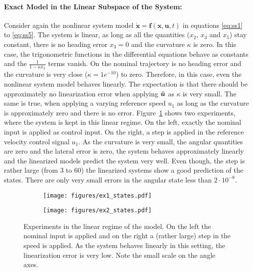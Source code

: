 \paragraph{Exact Model in the Linear Subspace of the System: }
Consider again the nonlinear system model $\mathbf{\dot{x}} = \mathbf{f}(\mathbf{x}, \mathbf{u}, t)$ in equations \eqref{eq:ss1} to \eqref{eq:ss5}.
The system is linear, as long as all the quantities ($x_2$, $x_3$ and $x_5$) stay constant, there is no heading error $x_3 = 0$ and the curvature $\kappa$ is zero.
In this case, the trigonometric functions in the differential equations behave as constants and the $\frac{1}{1- \kappa x_2}$ terms vanish.
On the nominal trajectory is no heading error and the curvature is very close ($\kappa = 1e^{-10}$) to zero.
Therefore, in this case, even the nonlinear system model behaves linearly.
The expectation is that there should be approximately no linearization error when applying $\boldsymbol{\bar{u}}$ as $\kappa$ is very small.
The same is true, when applying a varying reference speed $u_1$ as long as the curvature is approximately zero and there is no error.
Figure~\ref{fig:ex1_ex2} shows two experiments, where the system is kept in this linear regime.
On the left, exactly the nominal input is applied as control input.
On the right, a step is applied in the reference velocity control signal $u_1$.
As the curvature is very small, the angular quantities are zero and the lateral error is zero, the system behaves approximately linearly and the linearized models predict the system very well.
Even though, the step is rather large (from $3$ to $60$) the linearized systems show a good prediction of the states.
There are only very small errors in the angular state less than $2\cdot 10^{-8}$.
\begin{figure}[h!]
	\centering
	\begin{subfigure}{0.49\textwidth}
	\texttt{[image: figures/ex1\_states.pdf]}
	\end{subfigure}
	\begin{subfigure}{0.49\textwidth}
	\texttt{[image: figures/ex2\_states.pdf]}
	\end{subfigure}
	\caption{Experiments in the linear regime of the model. On the left the nominal input is applied and on the right a (rather large) step in the speed is applied. As the system behaves linearly in this setting, the linearization error is very low. Note the small scale on the angle axes.}
	\label{fig:ex1_ex2}
\end{figure}

